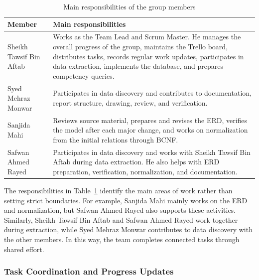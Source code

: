 \begin{table}[htbp]
    \centering
    \caption{Main responsibilities of the group members}
    \label{tab:collaboration-roles}
    \small
    \renewcommand{\arraystretch}{1.2}

    \begin{tabularx}{\textwidth}{
        @{}
        >{\raggedright\arraybackslash}p{}
        >{\raggedright\arraybackslash}X
        @{}
    }
        \toprule
        \textbf{Member} & \textbf{Main responsibilities} \\
        \midrule

        Sheikh Tawsif Bin Aftab &
        Works as the Team Lead and Scrum Master. He manages the overall progress
        of the group, maintains the Trello board, distributes tasks, records regular
        work updates, participates in data extraction, implements the database, and
        prepares competency queries. \\

Syed Mehraz Monwar &
Participates in data discovery and contributes to documentation, report
structure, drawing, review, and verification. \\

Sanjida Mahi &
Reviews source material, prepares and revises the ERD, verifies the model after
each major change, and works on normalization from the initial relations
through BCNF. \\

Safwan Ahmed Rayed &
Participates in data discovery and works with Sheikh Tawsif Bin
Aftab during data extraction. He also helps with ERD preparation,
verification, normalization, and documentation. \\

        \bottomrule
    \end{tabularx}
\end{table}

The responsibilities in Table~\ref{tab:collaboration-roles} identify the
main areas of work rather than setting strict boundaries. For example,
Sanjida Mahi mainly works on the ERD and normalization, but Safwan Ahmed
Rayed also supports these activities. Similarly, Sheikh Tawsif Bin Aftab
and Safwan Ahmed Rayed work together during extraction, while Syed Mehraz
Monwar contributes to data discovery with the other members. In this way,
the team completes connected tasks through shared effort.



\subsubsection{Task Coordination and Progress Updates}


